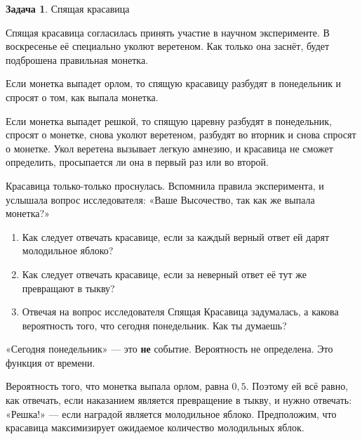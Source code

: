 \documentclass[nobib]{tufte-handout}
\theoremstyle{definition}
\newtheorem{problem}{Задача}
\begin{document}
\begin{problem}
Спящая красавица

Спящая красавица согласилась принять участие в научном эксперименте. В воскресенье её специально уколют веретеном. Как только она заснёт, будет подброшена правильная монетка.


Если монетка выпадет орлом, то спящую красавицу разбудят в понедельник и спросят о том, как выпала монетка.


Если монетка выпадет решкой, то спящую царевну разбудят в понедельник, спросят о монетке, снова уколют веретеном, разбудят во вторник и снова спросят о монетке. Укол веретена вызывает легкую амнезию, и красавица не сможет определить, просыпается ли она в первый раз или во второй.

Красавица только-только проснулась. Вспомнила правила эксперимента, и услышала вопрос исследователя: «Ваше Высочество, так как же выпала монетка?»
\begin{enumerate}
\item Как следует отвечать красавице, если за каждый верный ответ ей
дарят молодильное яблоко?
\item Как следует отвечать красавице, если за неверный ответ её тут
же превращают в тыкву?
\item Отвечая на вопрос исследователя Спящая Красавица задумалась, а какова вероятность того, что сегодня понедельник. Как ты думаешь?
\end{enumerate}



\begin{sol}
«Сегодня понедельник» — это \textbf{не} событие. Вероятность не
определена. Это функция от времени.

Вероятность того, что монетка выпала орлом, равна $0{,}5$. Поэтому ей
всё равно, как отвечать, если наказанием является превращение в
тыкву, и нужно отвечать: «Решка!» — если наградой является
молодильное яблоко. Предположим, что красавица максимизирует
ожидаемое количество молодильных яблок.
\end{sol}

\end{problem}
\end{document}
